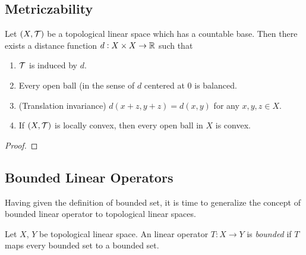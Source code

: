 \subsection{Metriczability}
\begin{thm}
\label{thm:topological_linear_spaces:Metriczability}
Let $(X, \mathcal{T})$ be a topological linear space which has a countable base. 
Then there exists a distance function $d: X \times X \to \mathbb{R}$ such that 
\begin{enumerate}
    \item $\mathcal{T}$ is induced by $d$. 
    \item Every open ball (in the sense of $d$ centered at $0$ is balanced. 
    \item (Translation invariance) $d(x + z, y + z) = d(x, y)$ for any 
    $x, y, z \in X$. 
    \item If $(X, \mathcal{T})$ is locally convex, then every open ball in $X$ is 
    convex. 
\end{enumerate}
\end{thm}
\begin{proof}

\end{proof}

\subsection{Bounded Linear Operators}
Having given the definition of bounded set, it is time to generalize the 
concept of bounded linear operator to topological linear spaces. 
\begin{defn}
Let $X$, $Y$ be topological linear space.
An linear operator $T: X \to Y$ is \emph{bounded} if $T$ maps every bounded 
set to a bounded set. 
\end{defn}

